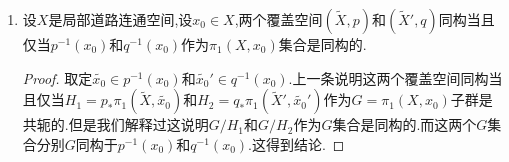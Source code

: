 \begin{enumerate}
\begin{proof}
		第一件事就是提升准则,$\widetilde{X}'$的连通性就说明态射的唯一性.第二件事是因为共轭实际上就是基点在纤维中的变化.
	\end{proof}
    \item 设$X$是局部道路连通空间,设$x_0\in X$,两个覆盖空间$(\widetilde{X},p)$和$(\widetilde{X}',q)$同构当且仅当$p^{-1}(x_0)$和$q^{-1}(x_0)$作为$\pi_1(X,x_0)$集合是同构的.
    \begin{proof}
    	
    	取定$\widetilde{x_0}\in p^{-1}(x_0)$和$\widetilde{x_0}'\in q^{-1}(x_0)$.上一条说明这两个覆盖空间同构当且仅当$H_1=p_*\pi_1(\widetilde{X},\widetilde{x_0})$和$H_2=q_*\pi_1(\widetilde{X}',\widetilde{x_0}')$作为$G=\pi_1(X,x_0)$子群是共轭的.但是我们解释过这说明$G/H_1$和$G/H_2$作为$G$集合是同构的.而这两个$G$集合分别$G$同构于$p^{-1}(x_0)$和$q^{-1}(x_0)$.这得到结论.
    \end{proof}
\end{enumerate}

